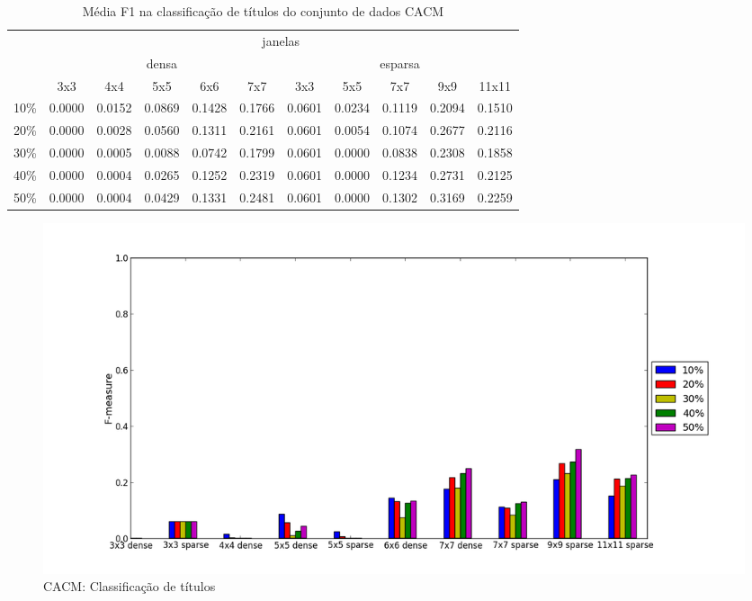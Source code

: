 \documentclass[a4paper,11pt]{article}
\begin{document}
  \begin{center}
    \begin{table}[p]
      \caption{Média F1 na classificação de títulos do conjunto de dados CACM}
      \begin{tabular}{ l | c c c c c || c c c c c | }
        \cline{2-11}
        & \multicolumn{10}{|c|}{janelas} \\
        \cline{2-11}
        & \multicolumn{5}{c||}{densa} & \multicolumn{5}{c|}{esparsa} \\
        \cline{2-11}
        & 3x3 & 4x4 & 5x5 & 6x6 & 7x7 & 3x3 & 5x5 & 7x7 & 9x9 & 11x11 \\
        \hline
        \multicolumn{1}{|l|}{10\%}& 0.0000& 0.0152& 0.0869& 0.1428& 0.1766& 0.0601& 0.0234& 0.1119& 0.2094& 0.1510\\
        \multicolumn{1}{|l|}{20\%}& 0.0000& 0.0028& 0.0560& 0.1311& 0.2161& 0.0601& 0.0054& 0.1074& 0.2677& 0.2116\\
        \multicolumn{1}{|l|}{30\%}& 0.0000& 0.0005& 0.0088& 0.0742& 0.1799& 0.0601& 0.0000& 0.0838& 0.2308& 0.1858\\
        \multicolumn{1}{|l|}{40\%}& 0.0000& 0.0004& 0.0265& 0.1252& 0.2319& 0.0601& 0.0000& 0.1234& 0.2731& 0.2125\\
        \multicolumn{1}{|l|}{50\%}& 0.0000& 0.0004& 0.0429& 0.1331& 0.2481& 0.0601& 0.0000& 0.1302& 0.3169& 0.2259\\
        \hline  
      \end{tabular}
    \end{table}
  \end{center}

  \begin{figure}[p]
    \centerline{\includegraphics[width=1.2\textwidth]{assets/experiment_charts/cacm_TextRegion_heading_f1.png}}
    \caption{CACM: Classificação de títulos}
    \label{fig:cacm_TextRegion_heading_f1}
  \end{figure}
\end{document}
